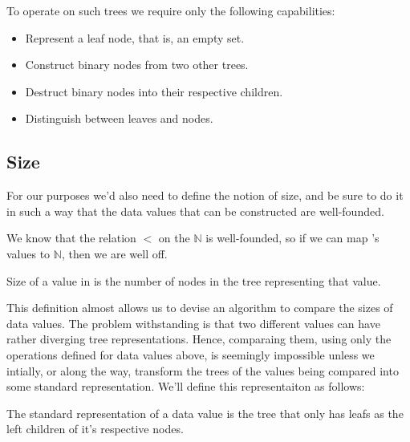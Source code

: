 To operate on such trees we require only the following capabilities:

\begin{itemize}

\item Represent a leaf node, that is, an empty set.

\item Construct binary nodes from two other trees.

\item Destruct binary nodes into their respective children.

\item Distinguish between leaves and nodes.

\end{itemize}

\subsection{Size}

For our purposes we'd also need to define the notion of size, and be sure to do
it in such a way that the data values that can be constructed are well-founded.

We know that the relation $<$ on the $\mathbb{N}$ is well-founded, so if we can
map 's values to $\mathbb{N}$, then we are well off.

\begin{definition}

Size of a value in  is the number of nodes in the tree representing
that value.

\end{definition}

This definition almost allows us to devise an algorithm to compare the sizes of
data values. The problem withstanding is that two different values can have
rather diverging tree representations. Hence, comparaing them, using only the
operations defined for data values above, is seemingly impossible unless we
intially, or along the way, transform the trees of the values being compared
into some standard representation. We'll define this representaiton as follows:

\begin{definition}

The standard representation of a data value is the tree that only has leafs as
the left children of it's respective nodes.

\end{definition}


